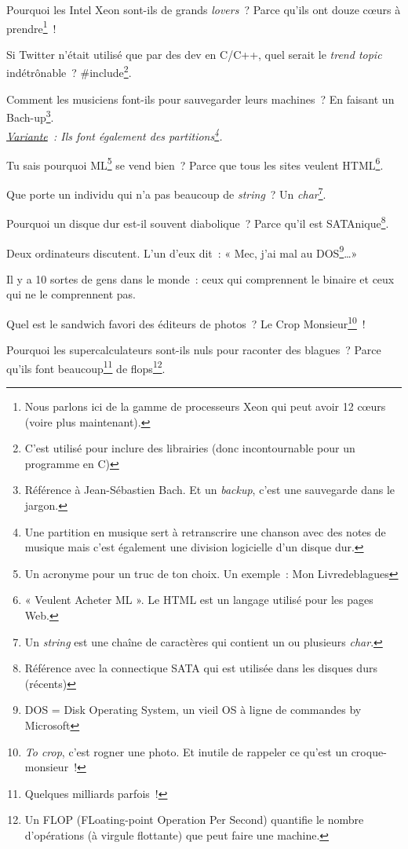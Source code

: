 \documentclass[10pt,a5paper,fullpage]{book}
\begin{document}
\begin{enumerate}
{		\item Pourquoi les Intel Xeon sont-ils de grands \textit{lovers}~? Parce qu'ils ont douze cœurs à prendre\footnote{Nous parlons ici de la gamme de processeurs Xeon qui peut avoir 12 cœurs (voire plus maintenant).}~!
		\item Si Twitter n'était utilisé que par des dev en C/C++, quel serait le \textit{trend topic} indétrônable~? \#include\footnote{C'est utilisé pour inclure des librairies (donc incontournable pour un programme en C)}.	
		\item Comment les musiciens font-ils pour sauvegarder leurs machines~? En faisant un Bach-up\footnote{Référence à Jean-Sébastien Bach. Et un \textit{backup}, c'est une sauvegarde dans le jargon.}.
		\\\textit{\underline{Variante}~: Ils font également des partitions\footnote{Une partition en musique sert à retranscrire une chanson avec des notes de musique mais c'est également une division logicielle d'un disque dur.}.} 
		\item Tu sais pourquoi ML\footnote{Un acronyme pour un truc de ton choix. Un exemple~: Mon Livredeblagues} se vend bien~? Parce que tous les sites veulent HTML\footnote{« Veulent Acheter ML ». Le HTML est un langage utilisé pour les pages Web.}.
		\item Que porte un individu qui n’a pas beaucoup de \textit{string}~? Un \textit{char}\footnote{Un \textit{string} est une chaîne de caractères qui contient un ou plusieurs \textit{char}.}.
		\item Pourquoi un disque dur est-il souvent diabolique~? Parce qu’il est SATAnique\footnote{Référence avec la connectique SATA qui est utilisée dans les disques durs (récents)}.
		\item Deux ordinateurs discutent. L’un d’eux dit~: « Mec, j’ai mal au DOS\footnote{DOS = Disk Operating System, un vieil OS à ligne de commandes by Microsoft}\ldots »
		\item Il y a 10 sortes de gens dans le monde~: ceux qui comprennent le binaire et ceux qui ne le comprennent pas.
		\item Quel est le sandwich favori des éditeurs de photos~? Le Crop Monsieur\footnote{\textit{To crop}, c'est rogner une photo. Et inutile de rappeler ce qu'est un croque-monsieur~!}~!
		\item Pourquoi les supercalculateurs sont-ils nuls pour raconter des blagues~? Parce qu’ils font beaucoup\footnote{Quelques milliards parfois~!} de flops\footnote{Un FLOP (FLoating-point Operation Per Second) quantifie le nombre d’opérations (à virgule flottante) que peut faire une machine.}. 
}
\end{enumerate}
\end{document}
